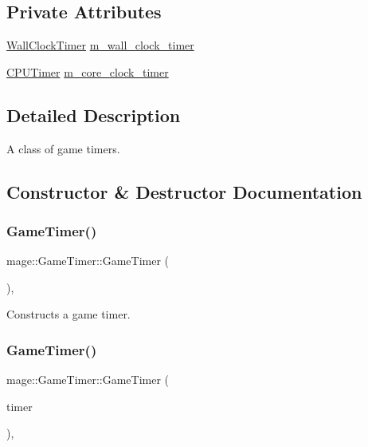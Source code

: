 \subsection*{Private Attributes}
\begin{DoxyCompactItemize}
\item 
\hyperlink{namespacemage_a06f4035ef59f07892e594bf1178a108a}{Wall\+Clock\+Timer} \hyperlink{classmage_1_1_game_timer_ae3746f7a55d6b150f2d1fead4a1f227c}{m\+\_\+wall\+\_\+clock\+\_\+timer}
\item 
\hyperlink{namespacemage_a1032d81f22079b7190cac3bf14136068}{C\+P\+U\+Timer} \hyperlink{classmage_1_1_game_timer_a7eb2652e13e4688115474a136a70c714}{m\+\_\+core\+\_\+clock\+\_\+timer}
\end{DoxyCompactItemize}


\subsection{Detailed Description}
A class of game timers. 

\subsection{Constructor \& Destructor Documentation}
\hypertarget{classmage_1_1_game_timer_a171e5e335b8c2ba77ce80b64bcad9ef5}{}\label{classmage_1_1_game_timer_a171e5e335b8c2ba77ce80b64bcad9ef5} 
\subsubsection{\texorpdfstring{Game\+Timer()}{GameTimer()}\hspace{0.1cm}{\footnotesize\ttfamily [1/3]}}
{\footnotesize\ttfamily mage\+::\+Game\+Timer\+::\+Game\+Timer (\begin{DoxyParamCaption}{ }\end{DoxyParamCaption})\hspace{0.3cm}{\ttfamily [default]}, {\ttfamily [noexcept]}}

Constructs a game timer. \hypertarget{classmage_1_1_game_timer_a0c70f8245381120b6e334db078affa00}{}\label{classmage_1_1_game_timer_a0c70f8245381120b6e334db078affa00} 
\subsubsection{\texorpdfstring{Game\+Timer()}{GameTimer()}\hspace{0.1cm}{\footnotesize\ttfamily [2/3]}}
{\footnotesize\ttfamily mage\+::\+Game\+Timer\+::\+Game\+Timer (\begin{DoxyParamCaption}\item[{const \hyperlink{classmage_1_1_game_timer}{Game\+Timer} \&}]{timer }\end{DoxyParamCaption})\hspace{0.3cm}{\ttfamily [default]}, {\ttfamily [noexcept]}}

